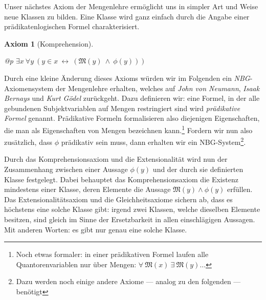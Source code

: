 \documentclass[a4paper,german,10pt,twoside]{book}
\newtheorem{ax}{Axiom}
\theoremstyle{definition}
\theoremstyle{remark}
\begin{document}
\par
Unser n{\"a}chstes Axiom der Mengenlehre erm{\"o}glicht uns in simpler Art und Weise neue Klassen zu bilden. Eine Klasse wird ganz einfach durch die Angabe einer pr{\"a}dikatenlogischen Formel charakterisiert.

\begin{ax}[Komprehension]
\label{axiom:comprehension} \hypertarget{axiom:comprehension}{}
\mbox{}
\begin{longtable}{{@{\extracolsep{\fill}}p{\linewidth}}}
\centering $\exists x\ \forall y\ (y \in x\ \leftrightarrow \ (\mathfrak{M}(y)\ \land \ \phi(y)))$
\end{longtable}

\end{ax}

Durch eine kleine {\"A}nderung dieses Axioms w{\"u}rden wir im Folgenden ein \emph{NBG}-Axiomensystem der Mengenlehre erhalten, welches auf \emph{John von Neumann}, \emph{Isaak Bernays} und \emph{Kurt G{\"o}del} zur{\"u}ckgeht.
Dazu definieren wir: eine Formel, in der alle gebundenen Subjektvariablen auf Mengen restringiert sind wird \emph{pr{\"a}dikative Formel} genannt. Pr{\"a}dikative Formeln formalisieren also diejenigen Eigenschaften, die man als {\glqq Eigenschaften von Mengen\grqq} bezeichnen kann.\footnote{Noch etwas formaler: in einer pr{\"a}dikativen Formel laufen alle Quantorenvariablen nur {\"u}ber Mengen: $\forall \ \mathfrak{M}(x) \ \exists \ \mathfrak{M}(y) \ldots$}
Fordern wir nun also zus{\"a}tzlich, dass $\phi$ pr{\"a}dikativ sein muss, dann erhalten wir ein NBG-System\footnote{Dazu werden noch einige andere Axiome --- analog zu den folgenden --- ben{\"o}tigt}.


\par
Durch das Komprehensionsaxiom und die Extensionalit{\"a}t wird nun der Zusammenhang zwischen einer Aussage $\phi(y)$ und der durch sie definierten Klasse festgelegt. Dabei behauptet das Komprehensionsaxiom die Existenz mindestens einer Klasse, deren Elemente die Aussage $\mathfrak{M}(y) \land \phi(y)$ erf{\"u}llen. Das Extensionalit{\"a}tsaxiom und die Gleichheitsaxiome sichern ab, dass es h{\"o}chstens eine solche Klasse gibt: irgend zwei Klassen, welche dieselben Elemente besitzen, sind gleich im Sinne der Ersetzbarkeit in allen einschl{\"a}gigen Aussagen. Mit anderen Worten: es gibt nur genau eine solche Klasse.
\end{document}
